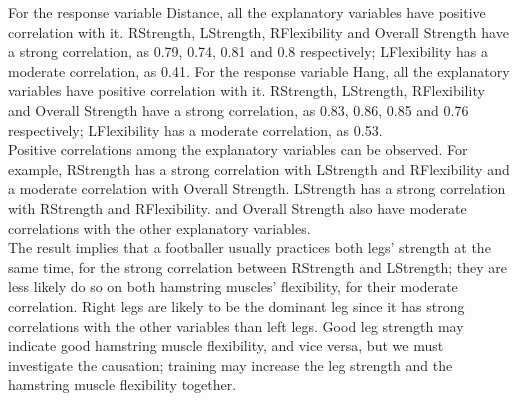 \documentclass[10pt]{article}
\begin{document}
\begin{enumerate}[1)]
For the response variable {\ttfamily Distance}, all the explanatory variables have positive correlation with it. {\ttfamily RStrength}, {\ttfamily LStrength}, {\ttfamily RFlexibility} and {\ttfamily Overall Strength} have a strong correlation, as 0.79, 0.74, 0.81 and 0.8 respectively; {\ttfamily LFlexibility} has a moderate correlation, as 0.41. For the response variable {\ttfamily Hang}, all the explanatory variables have positive correlation with it. {\ttfamily RStrength}, {\ttfamily LStrength}, {\ttfamily RFlexibility} and {\ttfamily Overall Strength} have a strong correlation, as 0.83, 0.86, 0.85 and 0.76 respectively; {\ttfamily LFlexibility} has a moderate correlation, as 0.53.\\
Positive correlations among the explanatory variables can be observed. For example, {\ttfamily RStrength} has a strong correlation with {\ttfamily LStrength} and {\ttfamily RFlexibility} and a moderate correlation with {\ttfamily Overall Strength}. {\ttfamily LStrength} has a strong correlation with {\ttfamily RStrength} and {\ttfamily RFlexibility}.  and {\ttfamily Overall Strength} also have moderate correlations with the other explanatory variables.\\
The result implies that a footballer usually practices both legs' strength at the same time, for the strong correlation between {\ttfamily RStrength} and {\ttfamily LStrength}; they are less likely do so on both hamstring muscles' flexibility, for their moderate correlation. Right legs are likely to be the dominant leg since it has strong correlations with the other variables than left legs. Good leg strength may indicate good hamstring muscle flexibility, and vice versa, but we must investigate the causation; training may increase the leg strength and the hamstring muscle flexibility together.\\


\end{enumerate}
\end{document}
